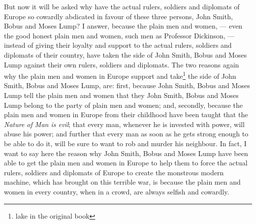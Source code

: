 But now it will be asked why have the actual rulers, soldiers and diplomats of Europe so cowardly abdicated in favour of these three persons, John Smith, Bobus and Moses Lump?
I answer, because the plain men and women, --- even the good honest plain men and women, such men as Professor Dickinson, --- instead of giving their loyalty and support to the actual rulers, soldiers and diplomats of their country, have taken the side of John Smith, Bobus and Moses Lump against their own rulers, soldiers and diplomats.
The two reasons again why the plain men and women in Europe support and take\footnote{lake in the original book} the side of John Smith, Bobus and Moses Lump, are: first, because John Smith, Bobus and Moses Lump tell the plain men and women that they John Smith, Bobus and Moses Lump belong to the party of plain men and women; and, secondly, because the plain men and women in Europe from their childhood have been taught that the \emph{Nature of Man is evil}; that every man, whenever he is invested with power, will abuse his power; and further that every man as soon as he gets strong enough to be able to do it, will be sure to want to rob and murder his neighbour.
In fact, I want to say here the reason why John Smith, Bobus and Moses Lump have been able to get the plain men and women in Europe to help them to force the actual rulers, soldiers and diplomats of Europe to create the monstrous modern machine, which has brought on this terrible war, is because the plain men and women in every country, when in a crowd, are always selfish and cowardly.

